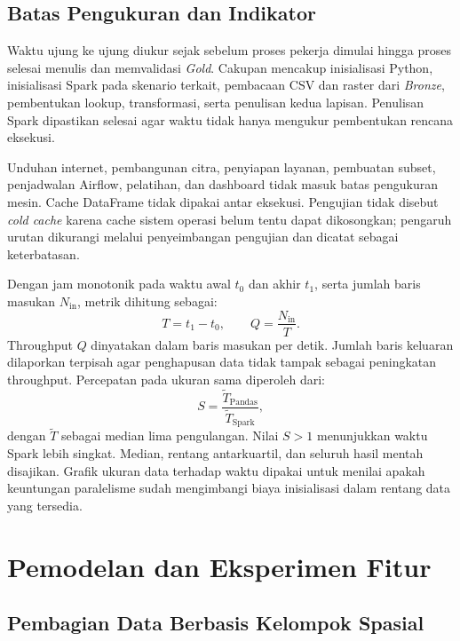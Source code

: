 \subsection{Batas Pengukuran dan Indikator}

Waktu ujung ke ujung diukur sejak sebelum proses pekerja dimulai hingga proses selesai menulis dan memvalidasi \textit{Gold}. Cakupan mencakup inisialisasi Python, inisialisasi Spark pada skenario terkait, pembacaan CSV dan raster dari \textit{Bronze}, pembentukan lookup, transformasi, serta penulisan kedua lapisan. Penulisan Spark dipastikan selesai agar waktu tidak hanya mengukur pembentukan rencana eksekusi.

Unduhan internet, pembangunan citra, penyiapan layanan, pembuatan subset, penjadwalan Airflow, pelatihan, dan dashboard tidak masuk batas pengukuran mesin. Cache DataFrame tidak dipakai antar eksekusi. Pengujian tidak disebut \textit{cold cache} karena cache sistem operasi belum tentu dapat dikosongkan; pengaruh urutan dikurangi melalui penyeimbangan pengujian dan dicatat sebagai keterbatasan.

Dengan jam monotonik pada waktu awal $t_0$ dan akhir $t_1$, serta jumlah baris masukan $N_{\mathrm{in}}$, metrik dihitung sebagai:
\begin{equation}
    T=t_1-t_0,\qquad Q=\frac{N_{\mathrm{in}}}{T}.
    \label{eq:bab3-throughput}
\end{equation}
Throughput $Q$ dinyatakan dalam baris masukan per detik. Jumlah baris keluaran dilaporkan terpisah agar penghapusan data tidak tampak sebagai peningkatan throughput. Percepatan pada ukuran sama diperoleh dari:
\begin{equation}
    S=\frac{\widetilde{T}_{\mathrm{Pandas}}}{\widetilde{T}_{\mathrm{Spark}}},
    \label{eq:bab3-speedup}
\end{equation}
dengan $\widetilde{T}$ sebagai median lima pengulangan. Nilai $S>1$ menunjukkan waktu Spark lebih singkat. Median, rentang antarkuartil, dan seluruh hasil mentah disajikan. Grafik ukuran data terhadap waktu dipakai untuk menilai apakah keuntungan paralelisme sudah mengimbangi biaya inisialisasi dalam rentang data yang tersedia.

\section{Pemodelan dan Eksperimen Fitur}

\subsection{Pembagian Data Berbasis Kelompok Spasial}

